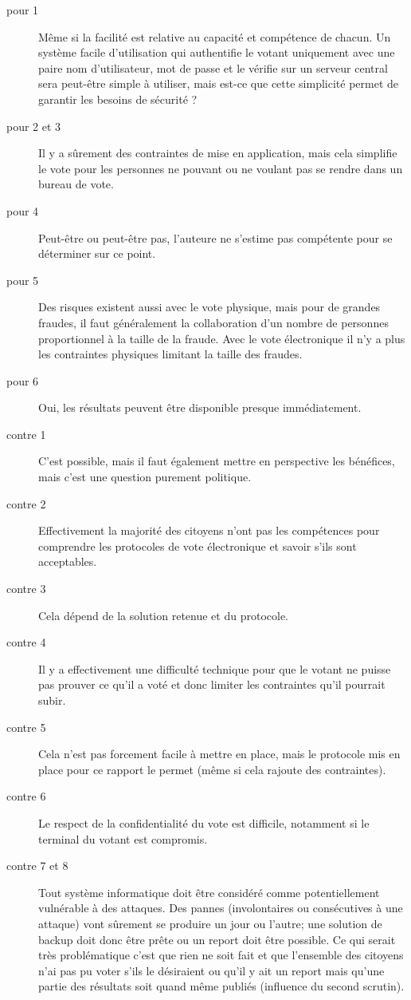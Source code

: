 \documentclass[../report]{subfiles}
\begin{document}
\begin{description}
	\item[pour 1] Même si la facilité est relative au capacité et compétence de chacun. 
		Un système facile d'utilisation qui authentifie le votant uniquement avec une 
		paire nom d'utilisateur, mot de passe et le vérifie sur un serveur central sera 
		peut-être simple à utiliser, mais est-ce que cette simplicité permet de garantir 
		les besoins de sécurité ?
	\item[pour 2 et 3] Il y a sûrement des contraintes de mise en application, mais cela simplifie 
	 	le vote pour les personnes ne pouvant ou ne voulant pas se rendre dans un bureau de vote.
 	\item[pour 4] Peut-être ou peut-être pas, l'auteure ne s'estime pas compétente pour se déterminer sur ce point.
 	\item[pour 5] Des risques existent aussi avec le vote physique, mais pour de grandes fraudes, il 
 		faut généralement la collaboration d'un nombre de personnes proportionnel à la taille de la fraude.
 		Avec le vote électronique il n'y a plus les contraintes physiques limitant la taille des fraudes.
 	\item[pour 6] Oui, les résultats peuvent être disponible presque immédiatement.
 	\item[contre 1] C'est possible, mais il faut également mettre en perspective les bénéfices, mais c'est une question purement politique.
 	\item[contre 2] Effectivement la majorité des citoyens n'ont pas les compétences pour comprendre 
 		les protocoles de vote électronique et savoir s'ils sont acceptables.
 	\item[contre 3] Cela dépend de la solution retenue et du protocole.
 	\item[contre 4] Il y a effectivement une difficulté technique pour que le votant ne puisse pas
 		prouver ce qu'il a voté et donc limiter les contraintes qu'il pourrait subir.
 	\item[contre 5] Cela n'est pas forcement facile à mettre en place, mais le protocole mis en place 
 		pour ce rapport le permet (même si cela rajoute des contraintes).
 	\item[contre 6] Le respect de la confidentialité du vote est difficile, notamment si le terminal du votant est compromis.
 	\item[contre 7 et 8] Tout système informatique doit être considéré comme potentiellement vulnérable à des attaques.
 		Des pannes (involontaires ou consécutives à une attaque) vont sûrement se produire un jour ou l'autre; une solution de backup
 		doit donc être prête ou un report doit être possible. Ce qui serait très problématique c'est que rien ne soit fait 
 		et que l'ensemble des citoyens n'ai pas pu voter s'ils le désiraient ou qu'il y ait un report mais qu'une partie des 
 		résultats soit quand même publiés (influence du second scrutin).
\end{description}
\end{document}
